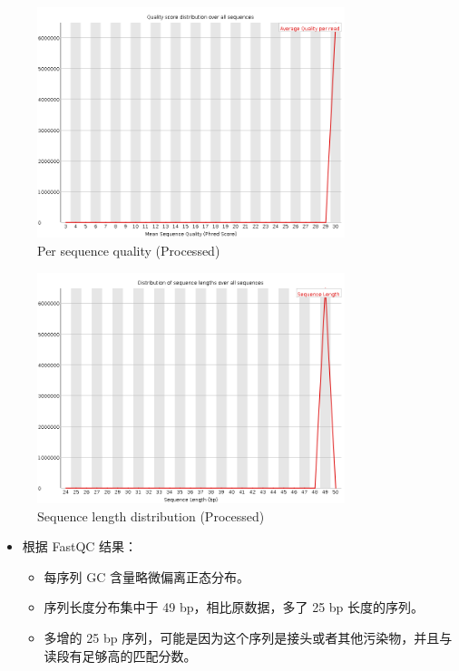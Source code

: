 \documentclass[UTF8]{ctexart}
\begin{document}
\begin{figure}[!htb]
	\centering
	\includegraphics[width=0.8\textwidth]{img/SRR14325859_FastQC_Processed_img/per_sequence_quality.png}	%
	\caption{Per sequence quality (Processed)\protect}    %
\end{figure}

\clearpage

\begin{figure}[!htb]
	\centering
	\includegraphics[width=0.8\textwidth]{img/SRR14325859_FastQC_Processed_img/sequence_length_distribution.png}	%
	\caption{Sequence length distribution (Processed)\protect}    %
\end{figure}

\begin{itemize}
	\item 根据 FastQC 结果：
	\begin{itemize}
		\item 每序列 GC 含量略微偏离正态分布。
		\item 序列长度分布集中于 49 bp，相比原数据，多了 25 bp 长度的序列。
		\item 多增的 25 bp 序列，可能是因为这个序列是接头或者其他污染物，并且与读段有足够高的匹配分数。
	\end{itemize}
\end{itemize}
\end{document}
